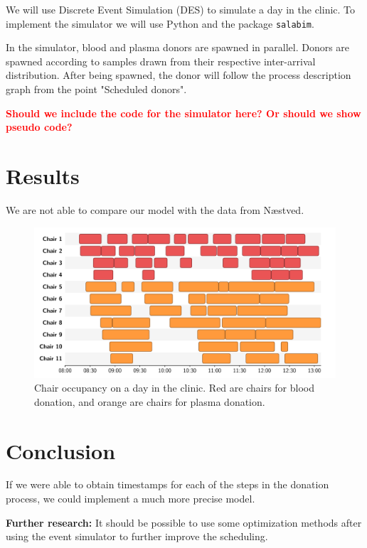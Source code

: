 \documentclass[a4paper,12pt]{article}
\newcommand{\red}[1]{\textcolor{red}{\textbf{#1}}}
\begin{document}
\bigbreak

We will use Discrete Event Simulation (DES) to simulate a day in the clinic. To implement the simulator we will use Python and the package \texttt{salabim}.

\bigbreak

In the simulator, blood and plasma donors are spawned in parallel. Donors are spawned according to samples drawn from their respective inter-arrival distribution. After being spawned, the donor will follow the process description graph from the point "Scheduled donors".

\bigbreak

\red{Should we include the code for the simulator here? Or should we show pseudo code?}

\section{Results}

We are not able to compare our model with the data from Næstved.

\begin{figure}[H]
    \begin{center}
    \includegraphics[scale=0.62]{schedule.pdf}
    \end{center}
    \caption{Chair occupancy on a day in the clinic. Red are chairs for blood donation, and orange are chairs for plasma donation.}
    \label{flow}
\end{figure}

\section{Conclusion}

If we were able to obtain timestamps for each of the steps in the donation process, we could implement a much more precise model.

\textbf{Further research:} It should be possible to use some optimization methods after using the event simulator to further improve the scheduling. 
\newpage



\end{document}
